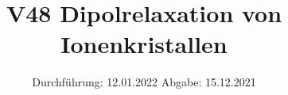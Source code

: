 

\subject{Fortgeschrittenenpraktikum}
\title{V48 Dipolrelaxation von Ionenkristallen}
\date{%
  Durchführung: 12.01.2022
  \hspace{3em}
  Abgabe: 15.12.2021
}



\maketitle
\thispagestyle{empty}
\tableofcontents
\newpage








\printbibliography{}




